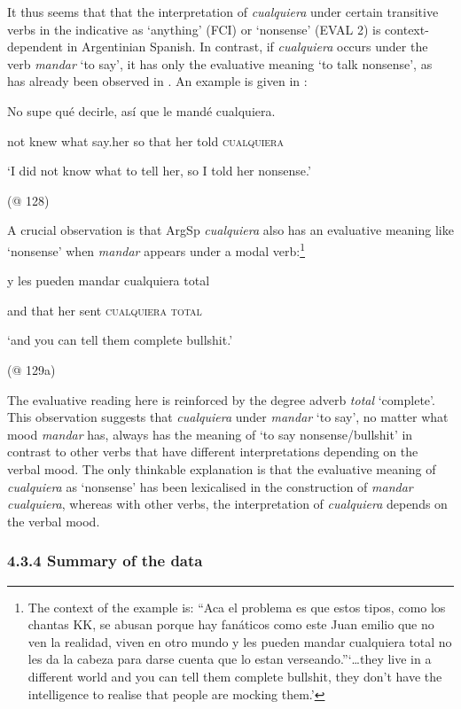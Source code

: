 \documentclass[output=paper]{langscibook}
\begin{document}
It thus seems that that the interpretation of \textit{cualquiera} under certain transitive verbs in the indicative as ‘anything’ (FCI) or ‘nonsense’ (EVAL 2) is context-dependent in Argentinian Spanish. In contrast, if \textit{cualquiera} occurs under the verb \textit{mandar} ‘to say’, it has only the evaluative meaning ‘to talk nonsense’, as has already been observed in . An example is given in :

\label{bkm:Ref150786556}    No  supe  qué  decirle,  así  que  le  mandé  cualquiera.

    not  knew  what  say.her  so  that  her  told  \textsc{cualquiera}

    ‘I did not know what to tell her, so I told her nonsense.’

    (@ 128)

A crucial observation is that ArgSp \textit{cualquiera} also has an evaluative meaning like ‘nonsense’ when \textit{mandar} appears under a modal verb:\footnote{The context of the example is: “Aca el problema es que estos tipos, como los chantas KK, se abusan porque hay fanáticos como este Juan emilio que no ven la realidad, viven en otro mundo y les pueden mandar cualquiera total no les da la cabeza para darse cuenta que lo estan verseando.”‘…they live in a different world and you can tell them complete bullshit, they don’t have the intelligence to realise that people are mocking them.’}

    y  les  pueden  mandar  cualquiera total  

    and  that  her  sent  \textsc{cualquiera} \textsc{total}

    ‘and you can tell them complete bullshit.’

    (@ 129a)

The evaluative reading here is reinforced by the degree adverb \textit{total} ‘complete’. This observation suggests that \textit{cualquiera} under \textit{mandar} ‘to say’, no matter what mood \textit{mandar} has, always has the meaning of ‘to say nonsense/bullshit’ in contrast to other verbs that have different interpretations depending on the verbal mood. The only thinkable explanation is that the evaluative meaning of \textit{cualquiera} as ‘nonsense’ has been lexicalised in the construction of \textit{mandar cualquiera}, whereas with other verbs, the interpretation of \textit{cualquiera} depends on the verbal mood. 

\subsubsection{\textbf{4.3.4} \textbf{Summary} \textbf{of} \textbf{the} \textbf{data}}
\end{document}
